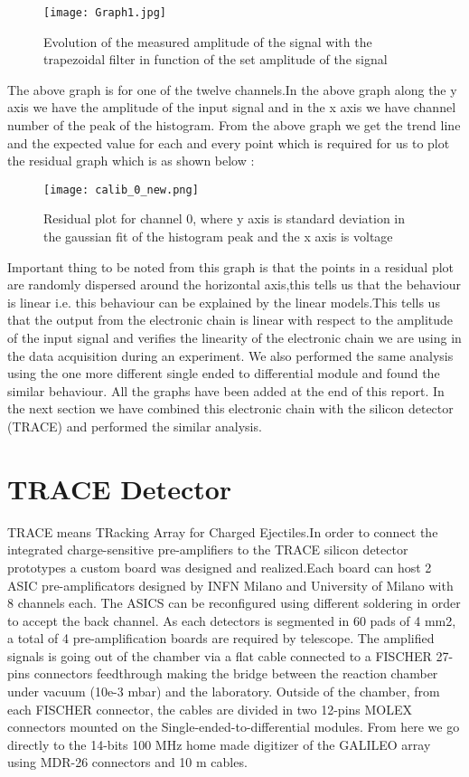 \documentclass[a4paper, 11pt]{article}
\begin{document}
\begin{figure}[h]
    \centering
    \texttt{[image: Graph1.jpg]}
    \caption{Evolution of the measured amplitude of the signal with the trapezoidal filter in function of the set amplitude of the signal}
\end{figure}

The above graph is for one of the twelve channels.In the above graph along the y axis we have the amplitude of the input signal and in the x axis we have channel number of the peak of the histogram. From the above graph we get the trend line and the expected value for each and every point which is required for us to plot the residual graph which is  as shown below :
\begin{figure}[h]
    \centering
    \texttt{[image: calib\_0\_new.png]}
    \caption{Residual plot for channel 0, where y axis is standard deviation in the gaussian fit of the histogram peak and the x axis is voltage }
    \label{fig:my_label}
\end{figure}



 Important thing to be noted from this graph is that the points in a residual plot are randomly dispersed around the horizontal axis,this tells us that the behaviour is linear i.e. this behaviour can be explained by the linear models.This tells us that the output from the electronic chain is linear with respect to the amplitude of the input signal and verifies the linearity of the electronic chain we are using in the data acquisition during an experiment.
We also performed the same analysis using the one more different single ended to differential module and found the similar behaviour. All the graphs have been added at the end of this report. In the next section we have combined this electronic chain with the silicon detector (TRACE) and performed the similar analysis. 


\section{TRACE Detector}
TRACE means TRacking Array for Charged Ejectiles.In order to connect the integrated charge-sensitive pre-amplifiers to the TRACE silicon detector prototypes a custom board was designed and realized.Each board can host 2 ASIC pre-amplificators designed by INFN Milano and University of Milano with 8 channels each. The ASICS can be reconfigured using different soldering in order to accept the back channel. As each detectors is segmented in 60 pads of 4 mm2, a total of 4 pre-amplification boards are required by telescope.
The amplified signals is going out of the chamber via a flat cable connected to a FISCHER 27-pins connectors feedthrough making the bridge between the reaction chamber under vacuum (10e-3 mbar) and the laboratory. Outside of the chamber, from each FISCHER connector, the cables are divided in two 12-pins MOLEX connectors mounted on the Single-ended-to-differential modules. From here we go directly to the 14-bits 100 MHz home made digitizer of the GALILEO array using MDR-26 connectors and 10 m cables.
\end{document}
